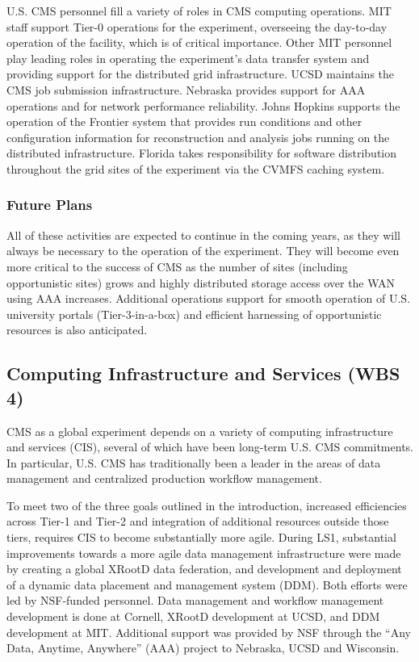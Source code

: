 \documentclass[11pt,a4paper]{article}
\begin{document}
U.S. CMS personnel fill a variety of roles in CMS computing operations.
MIT staff support Tier-0 operations for the experiment, overseeing the
day-to-day operation of the facility, which is of critical importance.  Other 
MIT personnel play leading roles in
operating the experiment's data transfer system and providing support for
the distributed grid infrastructure.  UCSD maintains the CMS job submission
infrastructure.  Nebraska provides support for AAA operations and for
network performance reliability.  Johns Hopkins supports the operation of
the Frontier system that provides run conditions and other configuration
information for reconstruction and analysis jobs running on the distributed
infrastructure.  Florida takes responsibility for software distribution
throughout the grid sites of the experiment via the CVMFS caching system.

\subsubsection{Future Plans}

All of these activities are expected to continue in the coming years, as
they will always be necessary to the operation of the experiment.  They
will become even more critical to the success of CMS as the number of sites
(including opportunistic sites) grows and highly distributed storage access
over the WAN using AAA increases.  Additional operations support for smooth
operation of U.S. university portals (Tier-3-in-a-box) and efficient
harnessing of opportunistic resources is also anticipated.

\subsection{Computing Infrastructure and Services (WBS 4)}
\label{cis}

CMS as a global experiment depends on a variety of computing infrastructure
and services (CIS), several of which have been long-term U.S. CMS
commitments. In particular, U.S. CMS has traditionally been a leader in 
the areas of data management and centralized production workflow management.

To meet two of the three goals outlined in the introduction, increased
efficiencies across Tier-1 and Tier-2 and integration of additional
resources outside those tiers, requires CIS to become substantially more
agile.  During LS1, substantial improvements towards a more agile data
management infrastructure were made by creating a global XRootD data
federation, and development and deployment of a dynamic data placement and
management system (DDM).  Both efforts were led by NSF-funded
personnel. Data management and workflow management development is done at
Cornell, XRootD development at UCSD, and DDM development at MIT.
Additional support was provided by NSF through the ``Any Data, Anytime,
Anywhere'' (AAA) project to Nebraska, UCSD and Wisconsin.
\end{document}
